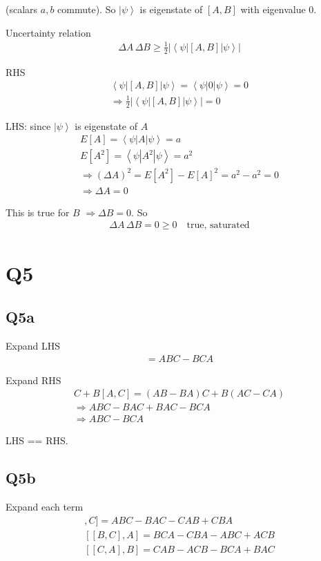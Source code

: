 \documentclass[
]{article}
\providecommand{\ket}[1]{\left\lvert #1 \right\rangle}
\providecommand{\braket}[1]{\left\langle #1 \right\rangle}
\providecommand{\Rarr}{\Rightarrow}
\begin{document}
(scalars \(a,b\) commute). So \(\ket{\psi}\) is eigenstate of \([A,B]\) with eigenvalue 0.

Uncertainty relation
\begin{gather*}
	\Delta A\,\Delta B\ge \tfrac{1}{2}|\braket{\psi|[A,B]|\psi}|
\end{gather*}

RHS
\begin{gather*}
	\braket{\psi|[A,B]|\psi}=\braket{\psi|0|\psi}=0\\
	\Rarr \tfrac{1}{2}|\braket{\psi|[A,B]|\psi}|=0
\end{gather*}

LHS: since \(\ket{\psi}\) is eigenstate of \(A\)
\begin{gather*}
	E[A]=\braket{\psi|A|\psi}=a\\
	E[A^2]=\braket{\psi|A^2|\psi}=a^2\\
	\Rarr (\Delta A)^2=E[A^2]-E[A]^2=a^2-a^2=0\\
	\Rarr \Delta A=0
\end{gather*}

This is true for \(B\) \(\Rarr \Delta B=0\). So
\begin{gather*}
	\Delta A\,\Delta B=0\ge 0 \quad\text{true, saturated}
\end{gather*}

\section{Q5}
\subsection{Q5a}

Expand LHS
\begin{gather*}
	[A,BC]=ABC-BCA
\end{gather*}

Expand RHS
\begin{gather*}
	[A,B]C+B[A,C]=(AB-BA)C+B(AC-CA)\\
	\Rarr ABC-BAC+BAC-BCA\\
	\Rarr ABC-BCA
\end{gather*}

LHS == RHS.

\subsection{Q5b}

Expand each term
\begin{gather*}
	[[A,B],C]=ABC-BAC-CAB+CBA\\
	[[B,C],A]=BCA-CBA-ABC+ACB\\
	[[C,A],B]=CAB-ACB-BCA+BAC
\end{gather*}
\end{document}
